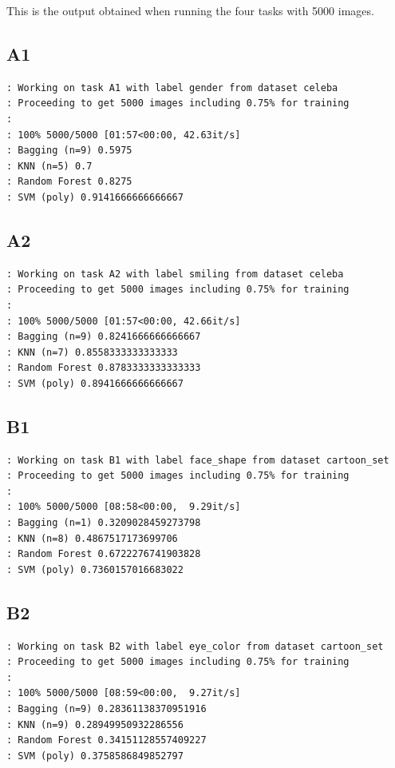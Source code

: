 \documentclass[a4paper,12pt,twoside,twocolumn]{article}
\begin{document}
This is the output obtained when running the four tasks with 5000 images.\\

\subsection{A1}
\label{sec:org7bbe919}

\begin{verbatim}
: Working on task A1 with label gender from dataset celeba
: Proceeding to get 5000 images including 0.75% for training
: 
: 100% 5000/5000 [01:57<00:00, 42.63it/s]
: Bagging (n=9) 0.5975
: KNN (n=5) 0.7
: Random Forest 0.8275
: SVM (poly) 0.9141666666666667
\end{verbatim}

\subsection{A2}
\label{sec:orgdf9145c}

\begin{verbatim}
: Working on task A2 with label smiling from dataset celeba
: Proceeding to get 5000 images including 0.75% for training
: 
: 100% 5000/5000 [01:57<00:00, 42.66it/s]
: Bagging (n=9) 0.8241666666666667
: KNN (n=7) 0.8558333333333333
: Random Forest 0.8783333333333333
: SVM (poly) 0.8941666666666667
\end{verbatim}

\subsection{B1}
\label{sec:org7a48b7f}

\begin{verbatim}
: Working on task B1 with label face_shape from dataset cartoon_set
: Proceeding to get 5000 images including 0.75% for training
: 
: 100% 5000/5000 [08:58<00:00,  9.29it/s]
: Bagging (n=1) 0.3209028459273798
: KNN (n=8) 0.4867517173699706
: Random Forest 0.6722276741903828
: SVM (poly) 0.7360157016683022
\end{verbatim}

\subsection{B2}
\label{sec:org90a8d3a}

\begin{verbatim}
: Working on task B2 with label eye_color from dataset cartoon_set
: Proceeding to get 5000 images including 0.75% for training
: 
: 100% 5000/5000 [08:59<00:00,  9.27it/s]
: Bagging (n=9) 0.28361138370951916
: KNN (n=9) 0.28949950932286556
: Random Forest 0.34151128557409227
: SVM (poly) 0.3758586849852797
\end{verbatim}
\end{document}
